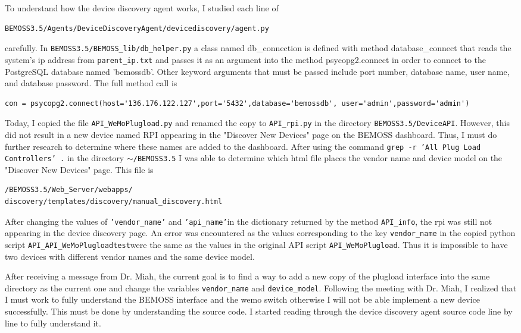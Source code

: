 \documentclass[fontsize=11pt, %
                             paper=letter, %
                             twoside, %
                             captions=tableheading,
                             index=totoc,
                             hyperref]{labbook}
\begin{document}
\begin{addmargin}[0cm]{0cm}
To understand how the device discovery agent works, I studied each line of 
\begin{verbatim}
BEMOSS3.5/Agents/DeviceDiscoveryAgent/devicediscovery/agent.py
\end{verbatim}
carefully. In \texttt{BEMOSS3.5/BEMOSS\_lib/db\_helper.py} a class named 
db\_connection is defined with method database\_connect that reads the system's ip address from \texttt{parent\_ip.txt} and passes it as an argument into the method psycopg2.connect in order to connect to the PostgreSQL database named 'bemossdb'. Other keyword arguments that must be passed include port number, database name, user name, and database password. The full method call is
\begin{verbatim}
con = psycopg2.connect(host='136.176.122.127',port='5432',database='bemossdb', user='admin',password='admin')
\end{verbatim}

Today, I copied the file \texttt{API\_WeMoPlugload.py} and renamed the copy to \texttt{API\_rpi.py} in the directory \texttt{BEMOSS3.5/DeviceAPI}. However, this did not result in a new device named RPI appearing in the "Discover New Devices" page on the BEMOSS dashboard. Thus, I must do further research to determine where these names are added to the dashboard. After using the command \texttt{grep -r 'All Plug Load Controllers' .} in the directory $\sim$\texttt{/BEMOSS3.5} I was able to determine which html file places the vendor name and device model on the "Discover New Devices" page. This file is
\begin{verbatim}
/BEMOSS3.5/Web_Server/webapps/
discovery/templates/discovery/manual_discovery.html
\end{verbatim}
After changing the values of \texttt{'vendor\_name'} and \texttt{'api\_name'}in the dictionary returned by the method \texttt{API\_info}, the rpi was still not appearing in the device discovery page. An error was encountered as the values corresponding to the key \texttt{vendor\_name} in the copied python script \texttt{API\_API\_WeMoPlugloadtest}were the same as the values in the original API script \texttt{API\_WeMoPlugload}. Thus it is impossible to have two devices with different vendor names and the same device model.

After receiving a message from Dr. Miah, the current goal is to find a way to add a new copy of the plugload interface into the same directory as the current one and change the variables \texttt{vendor\_name} and \texttt{device\_model}. Following the meeting with Dr. Miah, I realized that I must work to fully understand the BEMOSS interface and the wemo switch otherwise I will not be able implement a new device successfully. This must be done by understanding the source code. I started reading through the device discovery agent source code line by line to fully understand it.  


\end{addmargin}
\end{document}
